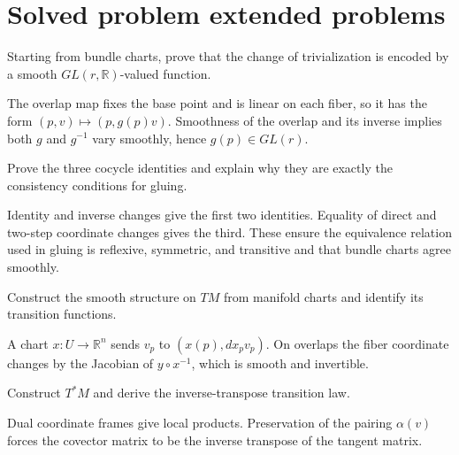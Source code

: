 \section{Solved problem extended problems}

\begin{problem}\label{prob:vii07-01}
Starting from bundle charts, prove that the change of trivialization is encoded by a smooth \(GL(r,\mathbb R)\)-valued function.
\end{problem}
\begin{solution}
The overlap map fixes the base point and is linear on each fiber, so it has the form \((p,v)\mapsto(p,g(p)v)\). Smoothness of the overlap and its inverse implies both \(g\) and \(g^{-1}\) vary smoothly, hence \(g(p)\in GL(r)\).
\end{solution}

\begin{problem}\label{prob:vii07-02}
Prove the three cocycle identities and explain why they are exactly the consistency conditions for gluing.
\end{problem}
\begin{solution}
Identity and inverse changes give the first two identities. Equality of direct and two-step coordinate changes gives the third. These ensure the equivalence relation used in gluing is reflexive, symmetric, and transitive and that bundle charts agree smoothly.
\end{solution}

\begin{problem}\label{prob:vii07-03}
Construct the smooth structure on \(TM\) from manifold charts and identify its transition functions.
\end{problem}
\begin{solution}
A chart \(x:U\to\mathbb R^n\) sends \(v_p\) to \((x(p),dx_pv_p)\). On overlaps the fiber coordinate changes by the Jacobian of \(y\circ x^{-1}\), which is smooth and invertible.
\end{solution}

\begin{problem}\label{prob:vii07-04}
Construct \(T^*M\) and derive the inverse-transpose transition law.
\end{problem}
\begin{solution}
Dual coordinate frames give local products. Preservation of the pairing \(\alpha(v)\) forces the covector matrix to be the inverse transpose of the tangent matrix.
\end{solution}

